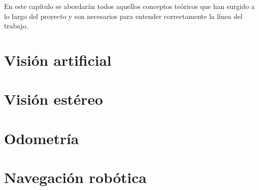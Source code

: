 
En este capítulo se abordarán todos aquellos conceptos teóricos que han surgido
a lo largo del proyecto y son necesarios para entender correctamente la línea
del trabajo.


\section{Visión artificial}
\label{2:sec:1}


\section{Visión estéreo}
\label{2:sec:2}


\section{Odometría}
\label{2:sec:3}


\section{Navegación robótica}
\label{2:sec:4}


